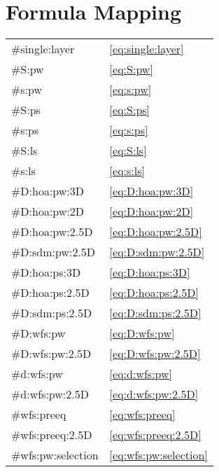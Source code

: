 \def \GITHUB {\GITHUBBASE/03_formula}

\chapter{Formula Mapping}
\label{cha:formula}
%

\begin{tabular}{ll}
    \#single:layer            & \eqref{eq:single:layer} \\
    \#S:pw                    & \eqref{eq:S:pw} \\
    \#s:pw                    & \eqref{eq:s:pw} \\
    \#S:ps                    & \eqref{eq:S:ps} \\
    \#s:ps                    & \eqref{eq:s:ps} \\
    \#S:ls                    & \eqref{eq:S:ls} \\
    \#s:ls                    & \eqref{eq:s:ls} \\
    \#D:hoa:pw:3D             & \eqref{eq:D:hoa:pw:3D} \\
    \#D:hoa:pw:2D             & \eqref{eq:D:hoa:pw:2D} \\
    \#D:hoa:pw:2.5D           & \eqref{eq:D:hoa:pw:2.5D} \\
    \#D:sdm:pw:2.5D           & \eqref{eq:D:sdm:pw:2.5D} \\
    \#D:hoa:ps:3D             & \eqref{eq:D:hoa:ps:3D} \\
    \#D:hoa:ps:2.5D           & \eqref{eq:D:hoa:ps:2.5D} \\
    \#D:sdm:ps:2.5D           & \eqref{eq:D:sdm:ps:2.5D} \\
    \#D:wfs:pw                & \eqref{eq:D:wfs:pw} \\
    \#D:wfs:pw:2.5D           & \eqref{eq:D:wfs:pw:2.5D} \\
    \#d:wfs:pw                & \eqref{eq:d:wfs:pw} \\
    \#d:wfs:pw:2.5D           & \eqref{eq:d:wfs:pw:2.5D} \\
    \#wfs:preeq               & \eqref{eq:wfs:preeq} \\
    \#wfs:preeq:2.5D          & \eqref{eq:wfs:preeq:2.5D} \\
    \#wfs:pw:selection        & \eqref{eq:wfs:pw:selection} \\

\end{tabular}
